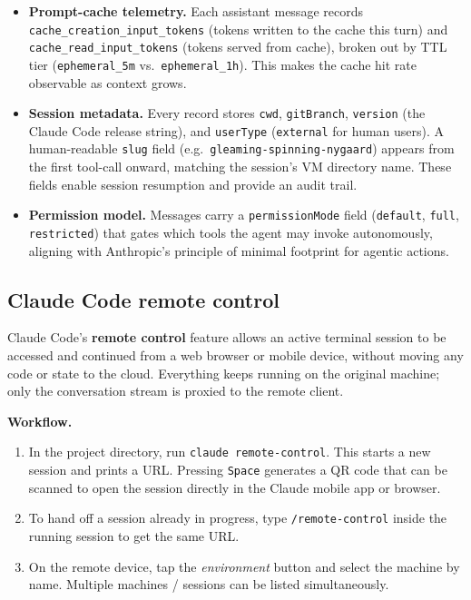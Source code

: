 \begin{itemize}
  \item \textbf{Prompt-cache telemetry.} Each assistant message records
    \texttt{cache\_creation\_input\_tokens} (tokens written to the cache this turn) and
    \texttt{cache\_read\_input\_tokens} (tokens served from cache), broken out by
    TTL tier (\texttt{ephemeral\_5m} vs.\ \texttt{ephemeral\_1h}). This makes the cache
    hit rate observable as context grows.

  \item \textbf{Session metadata.} Every record stores \texttt{cwd}, \texttt{gitBranch},
    \texttt{version} (the Claude Code release string), and \texttt{userType}
    (\texttt{external} for human users). A human-readable \texttt{slug} field
    (e.g.\ \texttt{gleaming-spinning-nygaard}) appears from the first tool-call onward,
    matching the session's VM directory name. These fields enable session resumption and
    provide an audit trail.

  \item \textbf{Permission model.} Messages carry a \texttt{permissionMode} field
    (\texttt{default}, \texttt{full}, \texttt{restricted}) that gates which tools the
    agent may invoke autonomously, aligning with Anthropic's principle of minimal
    footprint for agentic actions.
\end{itemize}

\subsection{Claude Code remote control}

Claude Code's \textbf{remote control} feature allows an active terminal session to be
accessed and continued from a web browser or mobile device, without moving any code or
state to the cloud. Everything keeps running on the original machine; only the
conversation stream is proxied to the remote client.

\textbf{Workflow.}
\begin{enumerate}
  \item In the project directory, run \texttt{claude remote-control}. This starts a
    new session and prints a URL. Pressing \texttt{Space} generates a QR code that
    can be scanned to open the session directly in the Claude mobile app or browser.
  \item To hand off a session already in progress, type \texttt{/remote-control}
    inside the running session to get the same URL.
  \item On the remote device, tap the \emph{environment} button and select the
    machine by name. Multiple machines / sessions can be listed simultaneously.
\end{enumerate}

